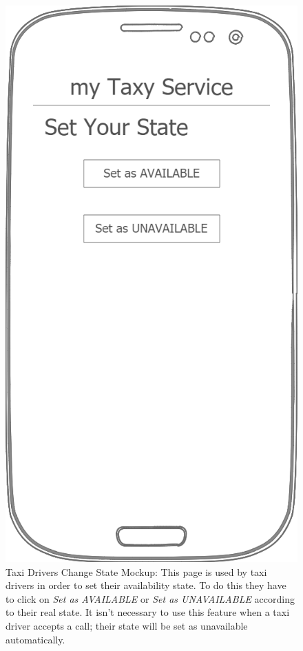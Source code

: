 \documentclass[a4paper]{article}
\begin{document}
\begin{enumerate}[label=\bfseries G\arabic*:]
\begin{figure}[H]
\includegraphics[width=\mockupWidth]{Mockup-TaxiDriversSetStatus}
\centering
\caption[Taxi Drivers Change State Mockup]{Taxi Drivers Change State Mockup: \newline This page is used by taxi drivers in order to set their availability state. To do this they have to click on \emph{Set as AVAILABLE} or \emph{Set as UNAVAILABLE} according to their real state. It isn't necessary to use this feature when a taxi driver accepts a call; their state will be set as unavailable automatically.}
\label{fig:mockuptaxidriversetstatus}
\end{figure}


\end{enumerate}
\end{document}
